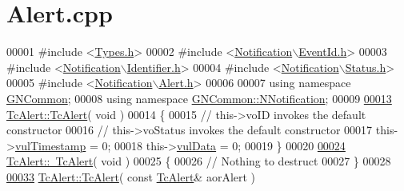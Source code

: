 \hypertarget{_alert_8cpp_source}{}\section{Alert.\+cpp}
\label{_alert_8cpp_source}

\begin{DoxyCode}
00001 \textcolor{preprocessor}{#include <\mbox{\hyperlink{_types_8h}{Types.h}}>}
00002 \textcolor{preprocessor}{#include <\mbox{\hyperlink{_event_id_8h}{Notification\(\backslash\)EventId.h}}>}
00003 \textcolor{preprocessor}{#include <\mbox{\hyperlink{_identifier_8h}{Notification\(\backslash\)Identifier.h}}>}
00004 \textcolor{preprocessor}{#include <\mbox{\hyperlink{_status_8h}{Notification\(\backslash\)Status.h}}>}
00005 \textcolor{preprocessor}{#include <\mbox{\hyperlink{_alert_8h}{Notification\(\backslash\)Alert.h}}>}
00006 
00007 \textcolor{keyword}{using namespace }\mbox{\hyperlink{namespace_g_n_common}{GNCommon}};
00008 \textcolor{keyword}{using namespace }\mbox{\hyperlink{namespace_g_n_common_1_1_n_notification}{GNCommon::NNotification}};
00009 
\mbox{\hyperlink{class_g_n_common_1_1_n_notification_1_1_tc_alert_a683af178a44e0ab7463c529d1ebb6d9c}{00013}} \mbox{\hyperlink{class_g_n_common_1_1_n_notification_1_1_tc_alert_a683af178a44e0ab7463c529d1ebb6d9c}{TcAlert::TcAlert}}( \textcolor{keywordtype}{void} )
00014 \{
00015    \textcolor{comment}{// this->voID     invokes the default constructor}
00016    \textcolor{comment}{// this->voStatus invokes the default constructor}
00017    this->\mbox{\hyperlink{class_g_n_common_1_1_n_notification_1_1_tc_alert_a3c6f656e3e526b9f97942188d7bb2930}{vulTimestamp}} = 0;
00018    this->\mbox{\hyperlink{class_g_n_common_1_1_n_notification_1_1_tc_alert_ab49cb616a0e61e74234264d775a3408a}{vulData}}      = 0;
00019 \}
00020 
\mbox{\hyperlink{class_g_n_common_1_1_n_notification_1_1_tc_alert_abd42f842fe53942ed6d7a7008c3400c2}{00024}} \mbox{\hyperlink{class_g_n_common_1_1_n_notification_1_1_tc_alert_abd42f842fe53942ed6d7a7008c3400c2}{TcAlert::~TcAlert}}( \textcolor{keywordtype}{void} )
00025 \{
00026    \textcolor{comment}{// Nothing to destruct}
00027 \}
00028 
\mbox{\hyperlink{class_g_n_common_1_1_n_notification_1_1_tc_alert_a75120f1735cec51fe7f4afa519bd631b}{00033}} \mbox{\hyperlink{class_g_n_common_1_1_n_notification_1_1_tc_alert_a683af178a44e0ab7463c529d1ebb6d9c}{TcAlert::TcAlert}}( \textcolor{keyword}{const} \mbox{\hyperlink{class_g_n_common_1_1_n_notification_1_1_tc_alert}{TcAlert}}& aorAlert )

\end{DoxyCode}
